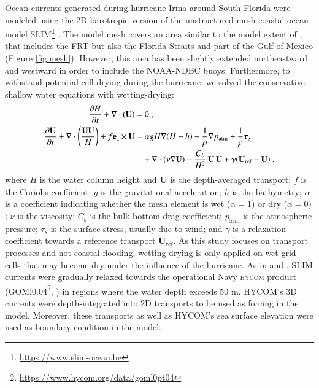 \documentclass[preprint,12pt,authoryear]{elsarticle}
\newcommand{\hycom}{\textsc{hycom} }
\newcommand{\UV}{\mathbf{U}}
\begin{document}
Ocean currents generated during hurricane Irma around South Florida were modeled using the 2D barotropic version of the unstructured-mesh coastal ocean model SLIM\footnote{\url{https://www.slim-ocean.be}} \citep{lambrechts2008multi}. The model mesh covers an area similar to the model extent of \cite{dobbelaere2020coupled}, that includes the FRT but also the Florida Straits and part of the Gulf of Mexico (Figure \ref{fig:mesh}). However, this area has been slightly extended northeastward and westward in order to include the NOAA-NDBC buoys. Furthermore, to withstand potential cell drying during the hurricane, we solved the conservative shallow water equations with wetting-drying:
\begin{equation}
    \begin{split}
        \dfrac{\partial H}{\partial t} +\nabla\cdot(\UV) =& ~0~, \\
        \dfrac{\partial \UV}{\partial t}  + \nabla\cdot\left(\dfrac{\UV\UV}{H}\right) + f\mathbf{e}_z \times \UV =& ~\alpha gH\nabla(H-h) - \dfrac{1}{\rho}\nabla p_\text{atm} + \dfrac{1}{\rho}\text{\boldmath$\tau$}_s \\
         &+\nabla\cdot(\nu\nabla\UV) - \dfrac{C_b}{H^2}|\UV|\UV + \gamma(\UV_\text{ref}-\UV)~,
    \end{split} \label{eq:slim}
\end{equation}
where $H$ is the water column height and $\UV$ is the depth-averaged transport; $f$ is the Coriolis coefficient; $g$ is the gravitational acceleration; $h$ is the bathymetry; $\alpha$ is a coefficient indicating whether the mesh element is wet ($\alpha=1$) or dry ($\alpha=0$) \citep{le2020implicit}; $\nu$  is the viscosity; $C_b$ is the bulk bottom drag coefficient; $p_\text{atm}$ is the atmospheric pressure; {\boldmath$\tau$}$_s$ is the surface stress, usually due to wind; and $\gamma$ is a relaxation coefficient towards a reference transport $\UV_\text{ref}$. As this study focuses on transport processes and not coastal flooding, wetting-drying is only applied on wet grid cells that may become dry under the influence of the hurricane. As in \cite{frys2020fine} and \cite{dobbelaere2020coupled}, SLIM currents were gradually relaxed towards the operational Navy \hycom product (GOMl0.04\footnote{\url{https://www.hycom.org/data/goml0pt04}}, \cite{chassignet2007hycom}) in regions where the water depth exceeds 50 m. HYCOM's 3D currents were depth-integrated into 2D transports to be used as forcing in the model. Moreover, these transports as well as HYCOM's sea surface elevation were used as boundary condition in the model.
\end{document}
